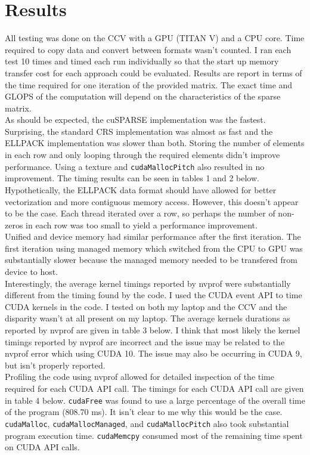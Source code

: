 \documentclass{article}
\begin{document}
\section{Results}

All testing was done on the CCV with a GPU (TITAN V) and a CPU core. 
Time required to copy data and convert between formats
wasn't counted. I ran each test 10 times and timed each run individually
so that the start up memory transfer cost for each approach could be evaluated.
Results are report in terms of the time required for one iteration of the
provided matrix.
The exact time and GLOPS of the computation will depend on the characteristics of the
sparse matrix. \\

As should be expected, the cuSPARSE implementation was the fastest. Surprising,
the standard CRS implementation was almost as fast and the ELLPACK
implementation was slower than both. Storing the number of elements in each
row and only looping through the required elements didn't improve performance.
Using a texture and \texttt{cudaMallocPitch} also resulted in no improvement.
The timing results can be seen in tables 1 and 2 below. Hypothetically,
the ELLPACK data format should have allowed for better vectorization and
more contiguous memory access. However, this doesn't appear to be the case.
Each thread iterated over a row, so perhaps the number of non-zeros in each
row was too small to yield a performance improvement. \\ 

Unified and device memory
had similar performance after the first iteration. The first
iteration using managed memory which switched from the CPU to GPU was
substantially slower because the managed memory needed to be
transfered from device to host. \\

Interestingly, the average kernel timings reported by nvprof were substantially
different from the timing found by the code. I used the CUDA event API to
time CUDA kernels in the code. I tested on both my laptop and the CCV and the disparity
wasn't at all present on my laptop. The average kernels durations as reported
by nvprof are given in table 3 below. I think that most likely the
kernel timings reported by nvprof are incorrect and the issue may be related
to the nvprof error which using CUDA 10. The issue may also be occurring in CUDA
9, but isn't properly reported.  \\ 

Profiling the code using nvprof allowed for detailed inspection of the time
required for each CUDA API call. The timings for each CUDA API call are given
in table 4 below. \texttt{cudaFree} was found to use
a large percentage of the overall time of the program (808.70 ms). It isn't
clear to me why this would be the case. \texttt{cudaMalloc}, 
\texttt{cudaMallocManaged}, and \texttt{cudaMallocPitch}
also took substantial program execution time. \texttt{cudaMemcpy} consumed
most of the remaining time spent on CUDA API calls. \\
\end{document}
